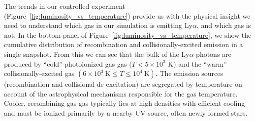 The trends in our controlled experiment (Figure~\ref{fig:luminosity_vs_temperature}) provide us with the physical insight we need to understand which gas in our simulation is emitting Ly$\alpha$, and which gas is not.
In the bottom panel of Figure~\ref{fig:luminosity_vs_temperature}, we show the cumulative distribution of recombination and collisionally-excited emission in a single snapshot.
From this we can see that the bulk of the Ly$\alpha$ photons are produced by ``cold'' photoionized gas gas ($T < 5\times 10^3$ K) and the ``warm'' collisionally-excited gas $(6\times10^3\ \mathrm{K} \leq T \leq 10^4\ \mathrm{K})$.
The emission sources (recombination and collisional de-excitation) are segregated by temperature on account of the astrophysical mechanisms responsible for the gas temperature.
Cooler, recombining gas gas typically lies at high densities with efficient cooling and must be ionized primarily by a nearby UV source, often newly formed stars.

